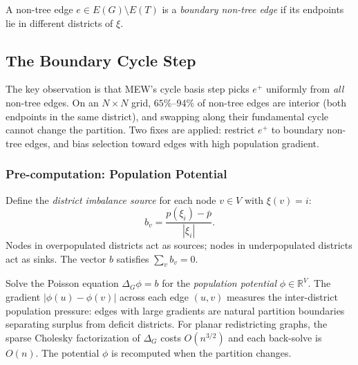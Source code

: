 \documentclass[11pt]{article}
\newcommand{\R}{\mathbb{R}}
\newcommand{\pbar}{\bar{p}}
\begin{document}
A non-tree edge $e \in E(G) \setminus E(T)$ is a \emph{boundary non-tree edge}
if its endpoints lie in different districts of $\xi$.

\subsection{The Boundary Cycle Step}

The key observation is that MEW's cycle basis step picks $e^+$ uniformly from
\emph{all} non-tree edges. On an $N \times N$ grid, $65\%$--$94\%$ of non-tree
edges are interior (both endpoints in the same district), and swapping along
their fundamental cycle cannot change the partition. Two fixes are applied:
restrict $e^+$ to boundary non-tree edges, and bias selection
toward edges with high population gradient.

\subsubsection*{Pre-computation: Population Potential}

Define the \emph{district imbalance source} for each node $v \in V$ with
$\xi(v) = i$:
\[
  b_v = \frac{p(\xi_i) - \pbar}{|\xi_i|}.
\]
Nodes in overpopulated districts act as sources; nodes in underpopulated
districts act as sinks. The vector $b$ satisfies $\sum_v b_v = 0$.

Solve the Poisson equation $\Delta_G \phi = b$ for the \emph{population
potential} $\phi \in \R^V$. The gradient $|\phi(u) - \phi(v)|$ across each
edge $(u,v)$ measures the inter-district population pressure: edges with large
gradients are natural partition boundaries separating surplus from deficit
districts. For planar redistricting graphs, the sparse Cholesky factorization
of $\Delta_G$ costs $O(n^{3/2})$ and each back-solve is $O(n)$. The potential
$\phi$ is recomputed when the partition changes.
\end{document}
